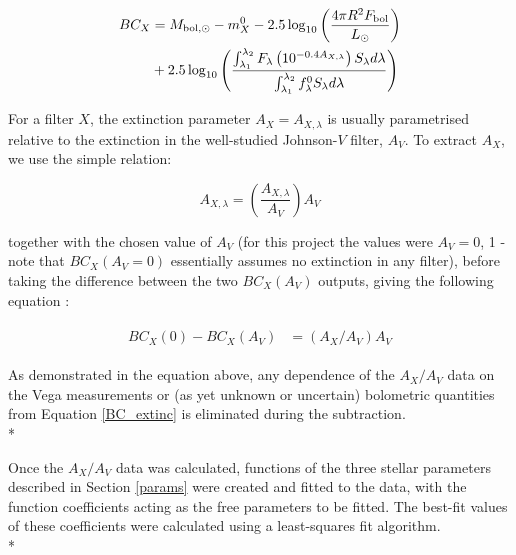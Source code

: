 \documentclass[12pt, a4paper]{report}
\begin{document}
\begin{align}
\begin{split}
BC_{X} &= M_{\textnormal{bol},\odot} - m_{X}^{0} - 2.5 \log_{10} \left( \frac{4\pi R^{2}F_{\textnormal{bol}}}{L_{\odot}} \right) \\
&+ 2.5 \log_{10} \left( \frac{\int_{\lambda_{1}}^{\lambda_{2}} F_{\lambda} \left( 10^{-0.4 A_{X,\lambda}} \right) S_{\lambda} d\lambda}{\int_{\lambda_{1}}^{\lambda_{2}} f_{\lambda}^{0} S_{\lambda} d\lambda} \right)
\label{BC_extinc}
\end{split}
\end{align}

For a filter $X$, the extinction parameter $A_{X} = A_{X,\lambda}$ is usually parametrised relative to the extinction in the well-studied Johnson-$V$ filter, $A_{V}$. To extract $A_{X}$, we use the simple relation:

\begin{equation}
A_{X,\lambda} = \left( \frac{A_{X,\lambda}}{A_{V}} \right) A_{V}
\label{ratio_eq}
\end{equation}

together with the chosen value of $A_{V}$ (for this project the values were $A_{V} = 0$, 1 - note that $BC_{X}(A_{V}=0)$ essentially assumes no extinction in any filter), before taking the difference between the two $BC_{X}(A_{V})$ outputs, giving the following equation \citep{2008PASP..120..583G}:

\begin{align}
\begin{split}
BC_{X}(0) - BC_{X}(A_{V}) &= \left(A_{X}/A_{V}\right)A_{V}
\label{BCs_diff}
\end{split}
\end{align}

As demonstrated in the equation above, any dependence of the $A_{X}/A_{V}$ data on the Vega measurements or (as yet unknown or uncertain) bolometric quantities from Equation \ref{BC_extinc} is eliminated during the subtraction. \\*

Once the $A_{X}/A_{V}$ data was calculated, functions of the three stellar parameters described in Section \ref{params} were created and fitted to the data, with the function coefficients acting as the free parameters to be fitted. The best-fit values of these coefficients were calculated using a least-squares fit algorithm.\\*
\end{document}
